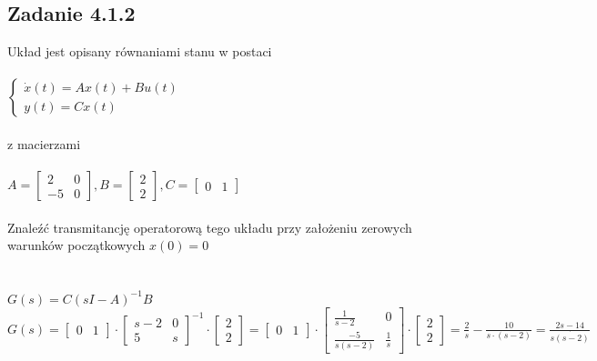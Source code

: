\pagebreak
\subsection*{Zadanie 4.1.2} {\color{darkgray}
	Układ jest opisany równaniami stanu w postaci\\\\
	$\begin{cases} \dot{x}(t)=Ax(t)+Bu(t)\\y(t)=Cx(t)\end{cases}$\\\\
	z macierzami\\\\
	$A=\left[\begin{array}{cc}2&0\\-5&0\end{array}\right],
	B=\left[\begin{array}{c}2\\2\end{array}\right],
	C=\left[\begin{array}{cc}0&1\end{array}\right]$\\\\
	Znaleźć transmitancję operatorową tego układu przy założeniu zerowych warunków początkowych $x(0)=0$\\
}\lineh
\\\\
$G(s)=C(sI-A)^{-1}B$\\
$G(s)=\left[\begin{array}{cc}0&1\end{array}\right]
\cdot
\left[\begin{array}{cc}{s-2}&0\\5&s\end{array}\right]^{-1}
\cdot
\left[\begin{array}{c}2\\2\end{array}\right]=\left[\begin{array}{cc}0&1\end{array}\right]
\cdot 
\left[\begin{array}{cc}{\frac{1}{s-2}}&0\\\frac{-5}{s(s-2)}&\frac{1}{s}\end{array}\right]
\cdot
\left[\begin{array}{c}2\\2\end{array}\right]=\frac{2}{s}-\frac{10}{s\cdot(s-2)}=\frac{2s-14}{s\dot{(s-2)}}
$

